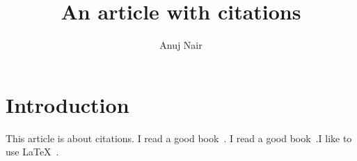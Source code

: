 \documentclass{article}
\title{ An article with citations }
\author{Anuj Nair}
\date{}
\begin{document}
\maketitle

\section{Introduction}
This article is about citations. I read a good book~\cite{smith2012}. I read a good book~\cite{hall2013}.I like to use {\LaTeX}~\cite{latex}.
				



\end{document}
